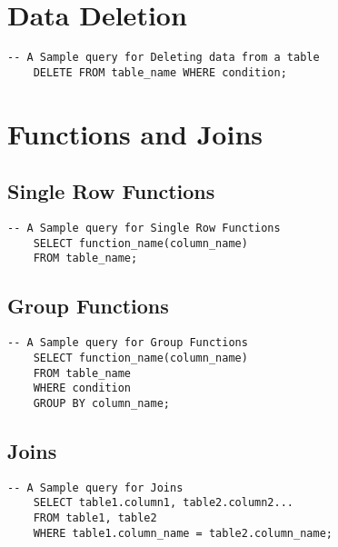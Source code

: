 \section{Data Deletion}
\begin{lstlisting}[caption={Sample one Table}, label={lst:d1}]
    -- A Sample query for Deleting data from a table
    DELETE FROM table_name WHERE condition;
    \end{lstlisting}

\section{Functions and Joins}

\subsection{Single Row Functions}
\begin{lstlisting}[caption={Sample one Table}, label={lst:s3}]
    -- A Sample query for Single Row Functions
    SELECT function_name(column_name)
    FROM table_name;
    \end{lstlisting}


\subsection{Group Functions}
\begin{lstlisting}[caption={Sample one Table}, label={lst:g1}]
    -- A Sample query for Group Functions
    SELECT function_name(column_name)
    FROM table_name
    WHERE condition
    GROUP BY column_name;
    \end{lstlisting}


\subsection{Joins}
\begin{lstlisting}[caption={Sample one Table}, label={lst:j1}]
    -- A Sample query for Joins
    SELECT table1.column1, table2.column2...
    FROM table1, table2
    WHERE table1.column_name = table2.column_name;
    \end{lstlisting}
